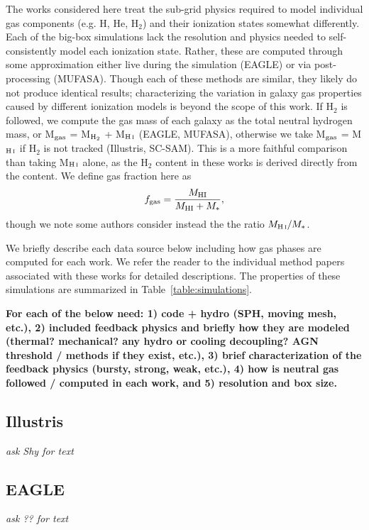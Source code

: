 \documentclass[fleqn,usenatbib]{mnras}
\begin{document}
The works considered here treat the sub-grid physics required to model individual gas components (e.g. H, He, H$_2$) and their ionization states somewhat differently. Each of the big-box simulations lack the resolution and physics needed to self-consistently model each ionization state. Rather, these are computed through some approximation either live during the simulation (EAGLE) or via post-processing (MUFASA). Though each of these methods are similar, they likely do not produce identical results; characterizing the variation in galaxy gas properties caused by different ionization models is beyond the scope of this work. If H$_2$ is followed, we compute the gas mass of each galaxy as the total neutral hydrogen mass, or M$_{\rm gas}$ = M$_{\rm H_2}$ + M$_{\rm \ion{H}{i}}$ (EAGLE, MUFASA), otherwise we take M$_{\rm gas}$ = M$_{\rm \ion{H}{i}}$ if H$_2$ is not tracked (Illustris, SC-SAM). This is a more faithful comparison than taking M$_{\rm \ion{H}{i}}$ alone, as the H$_2$ content in these works is derived directly from the  content. We define gas fraction here as
\begin{equation}
f_{\rm gas} = \frac{M_{\rm HI}}{M_{\rm HI} + M_{*}},
\end{equation}
though we note some authors consider instead the the ratio $M_{\ion{H}{i}} / M_{*}$.

We briefly describe each data source below including how gas phases are computed for each work. We refer the reader to the individual method papers associated with these works for detailed descriptions. The properties of these simulations are summarized in Table~\ref{table:simulations}.

{\bf For each of the below need: 1) code + hydro (SPH, moving mesh, etc.), 2) included feedback physics and briefly how they are modeled (thermal? mechanical? any hydro or cooling decoupling? AGN threshold / methods if they exist, etc.), 3) brief characterization of the feedback physics (bursty, strong, weak, etc.), 4) how is neutral gas followed / computed in each work, and 5) resolution and box size.}
\subsection{Illustris}
\label{sec:illustris method}
{\it ask Shy for text}

\subsection{EAGLE}
\label{sec:EAGLE method}
{\it ask ?? for text}
\end{document}
